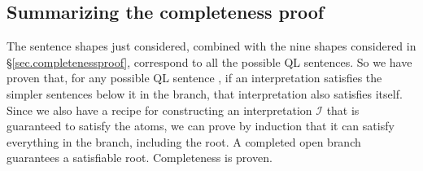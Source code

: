 \subsection{Summarizing the completeness proof}

The sentence shapes just considered, combined with the nine shapes considered in \S\ref{sec.completenessproof}, correspond to all the possible QL sentences. So we have proven that, for any possible QL sentence \metaA{}, if an interpretation satisfies the simpler sentences below it in the branch, that interpretation also satisfies \metaA{} itself. Since we also have a recipe for constructing an interpretation $\mathcal{I}$ that is guaranteed to satisfy the atoms, we can prove by induction that it can satisfy everything in the branch, including the root. A completed open branch guarantees a satisfiable root. Completeness is proven.

\iffalse

\practiceproblems

